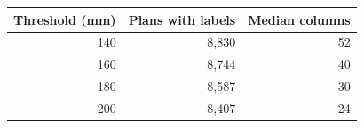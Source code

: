 \begin{tabular}{rrr}
\toprule
Threshold (mm) & Plans with labels & Median columns \\
\midrule
140 & 8,830 & 52 \\
160 & 8,744 & 40 \\
180 & 8,587 & 30 \\
200 & 8,407 & 24 \\
\bottomrule
\end{tabular}
